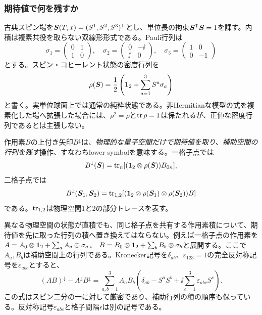 \subsubsection{期待値で何を残すか}
古典スピン場を$\boldsymbol S(T,x)=(S^1,S^2,S^3)^{\mathsf T}$とし、単位長の拘束$\boldsymbol S^{\mathsf T}\boldsymbol S=1$を課す。内積は複素共役を取らない双線形形式である。Pauli行列は
\begin{equation}
\sigma_1=\begin{pmatrix}0&1\\1&0\end{pmatrix},\quad
\sigma_2=\begin{pmatrix}0&-\ii\\\ii&0\end{pmatrix},\quad
\sigma_3=\begin{pmatrix}1&0\\0&-1\end{pmatrix}
\label{audit6q:eq:Pauli}
\end{equation}
とする。スピン・コヒーレント状態の密度行列を
\begin{equation}
\rho(\boldsymbol S)=\frac12\left(\mathbf 1_{2}+\sum_{a=1}^3S^a\sigma_a\right)
\label{audit6q:eq:rho}
\end{equation}
と書く。実単位球面上では通常の純粋状態である。非Hermitianな模型の式を複素化した場へ拡張した場合には、$\rho^2=\rho$と$\operatorname{tr}\rho=1$は保たれるが、正値な密度行列であるとは主張しない。

作用素$B$の上付き矢印$B^\downarrow$は、\emph{物理的な量子空間だけで期待値を取り、補助空間の行列を残す}操作、すなわちlower symbolを意味する。一格子点では
\begin{equation}
B^\downarrow(\boldsymbol S)=\operatorname{tr}_n[(\mathbf 1_{2}\otimes\rho(\boldsymbol S))B_{0n}],
\label{audit6q:eq:lower}
\end{equation}
二格子点では
\begin{equation}
B^\downarrow(\boldsymbol S_1,\boldsymbol S_2)
=\operatorname{tr}_{1,2}[(\mathbf 1_{2}\otimes\rho(\boldsymbol S_1)\otimes\rho(\boldsymbol S_2))B]
\label{audit6q:eq:lower2}
\end{equation}
である。$\operatorname{tr}_{1,2}$は物理空間1と2の部分トレースを表す。

異なる物理空間の状態が直積でも、同じ格子点を共有する作用素積について、期待値を先に取った行列の積へ置き換えてはならない。例えば一格子点の作用素を
$A=A_0\otimes\mathbf 1_{2}+\sum_a A_a\otimes\sigma_a$、
$B=B_0\otimes\mathbf 1_{2}+\sum_b B_b\otimes\sigma_b$と展開する。ここで$A_a,B_b$は補助空間上の行列である。Kronecker記号を$\delta_{ab}$、$\varepsilon_{123}=1$の完全反対称記号を$\varepsilon_{abc}$とすると、
\begin{equation}
(AB)^\downarrow-A^\downarrow B^\downarrow
=\sum_{a,b=1}^3 A_a B_b
\left(\delta_{ab}-S^aS^b+\ii\sum_{c=1}^3\varepsilon_{abc}S^c\right).
\label{audit6q:eq:star}
\end{equation}
この式はスピン二分の一に対して厳密であり、補助行列の積の順序も保っている。反対称記号$\varepsilon_{abc}$と格子間隔$\epsilon$は別の記号である。

